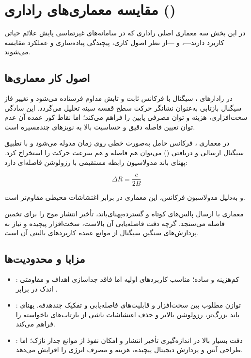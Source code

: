 \section{مقایسه معماری‌های راداری ()}
\label{sec:radar-architecture-comparison}

در این بخش سه معماری اصلی راداری که در سامانه‌های غیرتماسی پایش علائم حیاتی کاربرد دارند—،  و —از نظر اصول کاری، پیچیدگی پیاده‌سازی و عملکرد مقایسه می‌شوند.

\subsection{اصول کار معماری‌ها}
\label{sec:principles}

در رادارهای ، سیگنال با فرکانس ثابت و تابش مداوم فرستاده می‌شود و تغییر فاز سیگنال بازتابی به‌عنوان نشانگر حرکت سطح قفسه سینه تحلیل می‌گردد. این سادگی سخت‌افزاری، هزینه و توان مصرفی پایین را فراهم می‌کند؛ اما نقاط کور عمده آن عدم توان تعیین فاصله دقیق و حساسیت بالا به نویزهای چندمسیره است.

در معماری ، فرکانس حامل به‌صورت خطی روی زمان مدوله می‌شود و با تطبیق سیگنال ارسالی و دریافتی () می‌توان هم فاصله و هم سرعت حرکت را استخراج کرد. پهنای باند مدولاسیون رابطه ­مستقیمی با رزولوشن فاصله‌ای دارد:

\begin{equation}
\Delta R = \frac{c}{2B}
\label{eq:range_resolution_bandwidth}
\end{equation}

و به‌دلیل مدولاسیون فرکانس، این معماری در برابر اغتشاشات محیطی مقاوم‌تر است.

معماری  با ارسال پالس‌های کوتاه و گسترده‌پهنای‌باند، تأخیر انتشار موج را برای تخمین فاصله می‌سنجد. گرچه دقت فاصله‌یابی آن بالاست، سخت‌افزار پیچیده و نیاز به پردازش‌های سنگین سیگنال از موانع عمده کاربردهای بالینی آن است.

\subsection{مزایا و محدودیت‌ها}
\label{sec:advantages-limitations}

\begin{itemize}
    \item \textbf{}: کم‌هزینه و ساده؛ مناسب کاربردهای اولیه اما فاقد جداسازی اهداف و مقاومتی اندک در برابر .
    \item \textbf{}: توازن مطلوب بین سخت‌افزار و قابلیت‌های فاصله‌یابی و تفکیک چندهدفه. پهنای باند بزرگ‌تر، رزولوشن بالاتر و حذف اغتشاشات ناشی از بازتاب‌های ناخواسته را فراهم می‌کند.
    \item \textbf{}: دقت بسیار بالا در اندازه‌گیری تأخیر انتشار و امکان نفوذ از موانع جدار نازک؛ اما طراحی آنتن و پردازش دیجیتال پیچیده، هزینه و مصرف انرژی را افزایش می‌دهد.
\end{itemize}

